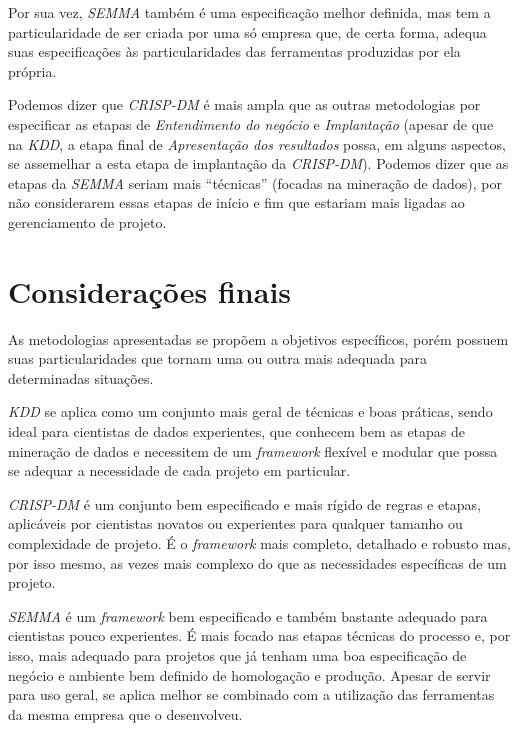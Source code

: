 \documentclass[
	article,			%
	11pt,				%
	oneside,			%
	a4paper,			%
	english,			%
	brazil,				%
	sumario=tradicional
	]{abntex2}
\begin{document}
Por sua vez, \textit{SEMMA} também é uma especificação melhor definida, mas tem
a particularidade de ser criada por uma só empresa que, de certa forma, adequa
suas especificações às particularidades das ferramentas produzidas por ela
própria.

Podemos dizer que \textit{CRISP-DM} é mais ampla que as outras metodologias por
especificar as etapas de \textit{Entendimento do negócio} e \textit{Implantação}
(apesar de que na \textit{KDD}, a etapa final de
\textit{Apresentação dos resultados} possa, em alguns aspectos, se assemelhar a
esta etapa de implantação da \textit{CRISP-DM}). Podemos dizer que as etapas da
\textit{SEMMA} seriam mais ``técnicas'' (focadas na mineração de dados), por não
considerarem essas etapas de início e fim que estariam mais ligadas ao
gerenciamento de projeto.

%

\section{Considerações finais}
\label{sec:final}

As metodologias apresentadas se propõem a objetivos específicos, porém possuem
suas particularidades que tornam uma ou outra mais adequada para determinadas
situações.

\textit{KDD} se aplica como um conjunto mais geral de técnicas e boas práticas,
sendo ideal para cientistas de dados experientes, que conhecem bem as etapas
de mineração de dados e necessitem de um \textit{framework} flexível e modular
que possa se adequar a necessidade de cada projeto em particular.

\textit{CRISP-DM} é um conjunto bem especificado e mais rígido de regras e etapas,
aplicáveis por cientistas novatos ou experientes para qualquer tamanho ou
complexidade de projeto. É o \textit{framework} mais completo, detalhado e
robusto mas, por isso mesmo, as vezes mais complexo do que as necessidades
específicas de um projeto.

\textit{SEMMA} é um \textit{framework} bem especificado e também bastante
adequado para cientistas pouco experientes. É mais focado nas etapas técnicas
do processo e, por isso, mais adequado para projetos que já tenham uma boa
especificação de negócio e ambiente bem definido de homologação e produção.
Apesar de servir para uso geral, se aplica melhor se combinado com a utilização
das ferramentas da mesma empresa que o desenvolveu.
\end{document}
